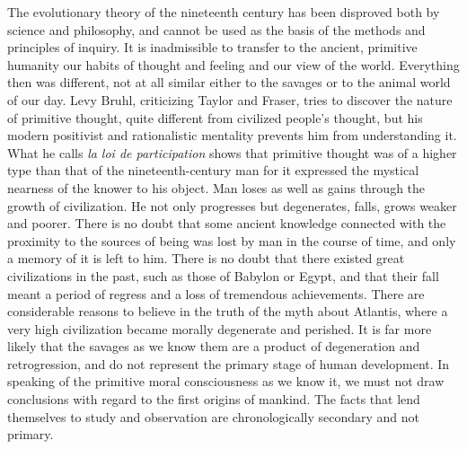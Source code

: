\begin{quotex}
The evolutionary theory of the nineteenth century has been disproved both by science and philosophy, and cannot be used as the basis of the methods and principles of inquiry. It is inadmissible to transfer to the ancient, primitive humanity our habits of thought and feeling and our view of the world. Everything then was different, not at all similar either to the savages or to the animal world of our day. Levy Bruhl, criticizing Taylor and Fraser, tries to discover the nature of primitive thought, quite different from civilized people's thought, but his modern positivist and rationalistic mentality prevents him from understanding it. What he calls \emph{la loi de participation} shows that primitive thought was of a higher type than that of the nineteenth-century man for it expressed the mystical nearness of the knower to his object. Man loses as well as gains through the growth of civilization. He not only progresses but degenerates, falls, grows weaker and poorer. There is no doubt that some ancient knowledge connected with the proximity to the sources of being was lost by man in the course of time, and only a memory of it is left to him. There is no doubt that there existed great civilizations in the past, such as those of Babylon or Egypt, and that their fall meant a period of regress and a loss of tremendous achievements. There are considerable reasons to believe in the truth of the myth about Atlantis, where a very high civilization became morally degenerate and perished. It is far more likely that the savages as we know them are a product of degeneration and retrogression, and do not represent the primary stage of human development. In speaking of the primitive moral consciousness as we know it, we must not draw conclusions with regard to the first origins of mankind. The facts that lend themselves to study and observation are chronologically secondary and not primary. 

\end{quotex}


